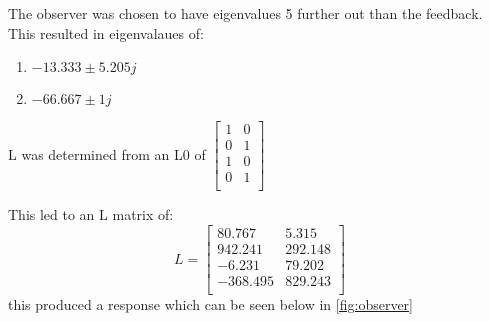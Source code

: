 The observer was chosen to have eigenvalues 5 further out than the feedback. This resulted in eigenvalaues of:\begin{enumerate}
\item$-13.333 \pm 5.205j$\\
\item$-66.667 \pm 1j$\end{enumerate}
L was determined from an L0 of $\begin{bmatrix}
1&0\\
0&1\\
1&0\\
0&1\\
\end{bmatrix}
$

This led to an L matrix of: \begin{equation}L = \begin{bmatrix}
80.767&5.315\\
942.241&292.148\\
-6.231&79.202\\
-368.495&829.243\\
\end{bmatrix}
\end{equation}this produced a response which can be seen below in \autoref{fig:observer}
